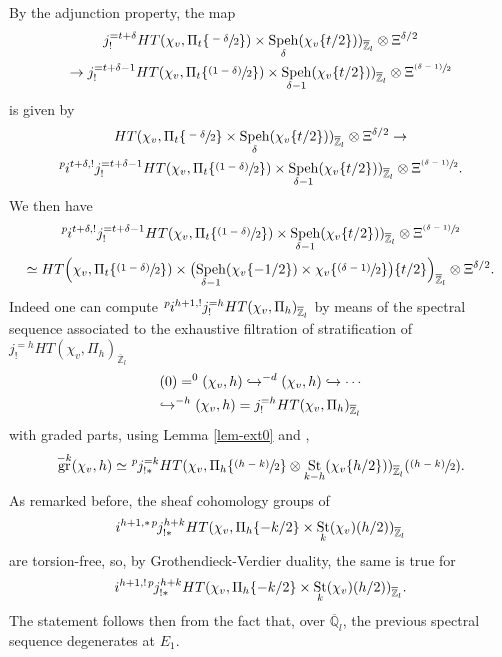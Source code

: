 \documentclass[11pt]{article}
\newcommand{\NoChangel}[1]{%
\expandafter\let\csname old\string#1\endcsname=#1
\let#1=\relax
\newcommand{#1}{\mathcode`l="716C\csname old\string#1\endcsname\mathcode`l="7160 }%
}
\def\hto{\mathrel{\lhook\joinrel\to}}
\newcommand{\psfrac}[2]{\sfrac{(#1)}{#2}}
\theoremstyle{plain}
\theoremstyle{definition}
\numberwithin{equation}{subsection}
\newcommand\Qm{{\mathbb Q}}
\newcommand\Zm{{\mathbb Z}}
\newcommand{\lexp}[2]{\kern \scriptspace \vphantom{#2}^{#1}\kern-\scriptspace#2}
\DeclareMathOperator{\speh}{Speh}
\DeclareMathOperator{\st}{St}
\DeclareMathOperator{\gr}{gr}
\DeclareMathOperator{\Fil}{Fil}\NoChangel{\Fil}
\begin{document}
By the adjunction property, the map
\begin{multline} \label{eq-map1}
j_!^{=t+\delta} HT(\chi_{v},\Pi_t \{\sfrac{-\delta}{2}\}) \times \speh_{\delta}
(\chi_{v}\{t/2\}))_{\overline \Zm_l} \otimes \Xi^{\delta/2} \\
\to j_!^{=t+\delta-1} HT(\chi_{v},\Pi_t \{\psfrac{1-\delta}{2}\}) \times
\speh_{\delta-1}(\chi_{v}\{t/2\}))_{\overline \Zm_l} \otimes \Xi^{\psfrac{\delta-1}{2}}
\end{multline}
is given by
\begin{multline}\label{eq-map2}
HT(\chi_{v},\Pi_t \{\sfrac{-\delta}{2}\} \times \speh_{\delta}(\chi_{v}\{t/2\}))_{\overline \Zm_l}
\otimes \Xi^{\delta/2} \to \\
\lexp p i^{t+\delta,!} j_!^{=t+\delta-1} HT(\chi_{v},\Pi_t \{\psfrac{1-\delta}{2}\}) \times
\speh_{\delta-1}(\chi_{v}\{t/2\}))_{\overline \Zm_l} \otimes \Xi^{\psfrac{\delta-1}{2}}.
\end{multline}
We then have
\begin{multline} \label{eq-map3}
\lexp p i^{t+\delta,!} j_!^{=t+\delta-1} HT(\chi_{v},\Pi_t \{\psfrac{1-\delta}{2}\}) \times
\speh_{\delta-1}(\chi_{v}\{t/2\}))_{\overline \Zm_l} \otimes \Xi^{\psfrac{\delta-1}{2}} \\ \simeq
HT \Bigl (\chi_{v}, \Pi_t \{\psfrac{1-\delta}{2}\}) \times \bigl (\speh_{\delta-1}(\chi_{v} \{-1/2\})
\times \chi_{v} \{\psfrac{\delta-1}{2}\} \bigr) \{t/2\} \Bigr)_{\overline \Zm_l} \otimes \Xi^{\delta/2}.
\end{multline}
Indeed one can compute $\lexp p i^{h+1,!} j_{!}^{=h} HT(\chi_v,\Pi_h)_{\overline \Zm_l}$ by means of
the spectral sequence associated to the exhaustive filtration of stratification of
$j_{!}^{=h} HT(\chi_v,\Pi_h)_{\overline \Zm_l}$
\begin{multline} \label{eq-filj}
(0)=\Fil^0(\chi_{v},h) \hto \Fil^{-d}(\chi_{v},h) \hto \cdots
\\
\hto \Fil^{-h}(\chi_{v},h)=j^{=h}_{!} HT(\chi_{v},\Pi_h)_{\overline \Zm_l}
\end{multline}
with graded parts, using Lemma \ref{lem-ext0} and \cite{boyer-torsion},
\[
\gr^{-k}(\chi_{v},h) \simeq \lexp p j^{=k}_{!*}
HT(\chi_{v},\Pi_h \{\psfrac{h-k}{2}\} \otimes \st_{k-h}(\chi_{v}\{h/2\}))_{\overline \Zm_l}(\psfrac{h-k}{2}).
\]
As remarked before, the sheaf cohomology groups of
\[
i^{h+1,*} \lexp p j_{!*}^{h+k} HT(\chi_v,\Pi_h \{-k/2\} \times \st_k(\chi_v)(h/2))_{\overline \Zm_l}
\]
are torsion-free, so, by Grothendieck-Verdier duality, the same is true for
\[
i^{h+1,!} \lexp p j_{!*}^{h+k} HT(\chi_v,\Pi_h \{-k/2\}\times \st_k(\chi_v)(h/2))_{\overline \Zm_l}.
\]
The statement follows then from the fact that, over
$\overline \Qm_l$, the previous spectral sequence degenerates at $E_1$.
\end{document}
